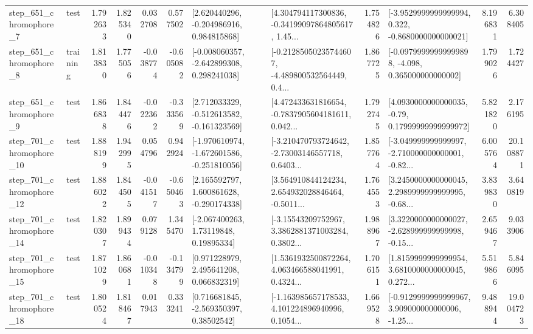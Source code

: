 \begin{tabular}{llrrrrllrlrr}
   step\_651\_chromophore\_7 &      test &      1.792633 &    1.825340 &      0.032708 &  0.577502 &    [2.620440296, -0.204986916, 0.984815868] &  [4.304794117300836, -0.34199097864805617, 1.45... &       1.754826 &  [-3.9529999999999994, 0.322, -0.8680000000000021] &            8.196831 &          6.308405 \\
   step\_651\_chromophore\_8 &  training &      1.813830 &    1.775056 &     -0.038774 & -0.605082 &   [-0.008060357, -2.642899308, 0.298241038] &  [-0.21285050235744607, -4.489800532564449, 0.4... &       1.867725 &  [-0.09799999999999898, -4.098, 0.365000000000002] &            1.799026 &          1.724427 \\
   step\_651\_chromophore\_9 &      test &      1.866838 &    1.844476 &     -0.022362 & -0.333569 &   [2.712033329, -0.512613582, -0.161323569] &  [4.472433631816654, -0.7837905604181611, 0.042... &       1.792745 &   [4.0930000000000035, -0.79, 0.17999999999999972] &            5.821820 &          2.176195 \\
  step\_701\_chromophore\_10 &      test &      1.888199 &    1.942995 &      0.054796 &  0.942924 &  [-1.970610974, -1.672601586, -0.251810056] &  [-3.210470793724642, -2.73003146557718, 0.6403... &       1.857764 &  [-3.049999999999997, -2.710000000000001, -0.82... &            6.005764 &         20.108871 \\
  step\_701\_chromophore\_12 &      test &      1.886022 &    1.844505 &     -0.041517 & -0.650463 &    [2.165592797, 1.600861628, -0.290174338] &  [3.564910844124234, 2.654932028846464, -0.5011... &       1.764553 &  [3.2450000000000045, 2.2989999999999995, -0.68... &            3.839830 &          3.640819 \\
  step\_701\_chromophore\_14 &      test &      1.820307 &    1.899434 &      0.079128 &  1.345470 &      [-2.067400263, 1.73119848, 0.19895334] &  [-3.15543209752967, 3.3862881371003284, 0.3802... &       1.988967 &  [3.3220000000000027, -2.628999999999998, -0.15... &            2.659467 &          9.033906 \\
  step\_701\_chromophore\_15 &      test &      1.871029 &    1.860681 &     -0.010348 & -0.134799 &     [0.971228979, 2.495641208, 0.066832319] &  [1.5361932500872264, 4.063466588041991, 0.4324... &       1.706151 &  [1.8159999999999954, 3.6810000000000045, 0.272... &            5.519866 &          5.846095 \\
  step\_701\_chromophore\_18 &      test &      1.800524 &    1.818467 &      0.017943 &  0.333241 &     [0.716681845, -2.569350397, 0.38502542] &  [-1.163985657178533, 4.101224896940996, 0.1054... &       1.669528 &  [-0.9129999999999967, 3.909000000000006, -1.25... &            9.488944 &         19.004723 \\

\end{tabular}
